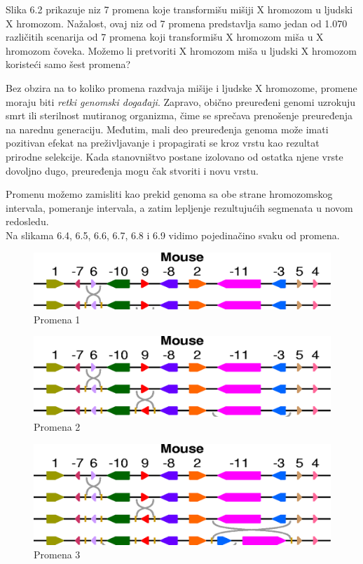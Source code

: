 Slika 6.2 prikazuje niz 7 promena koje transformišu mišiji X hromozom u ljudski X hromozom. Nažalost, ovaj niz od 7 promena predstavlja samo jedan od 1.070 različitih scenarija od 7 promena koji transformišu X hromozom miša u X hromozom čoveka. Možemo li pretvoriti X hromozom miša u ljudski X hromozom koristeći samo šest promena?

Bez obzira na to koliko promena razdvaja mišije i ljudske X hromozome, promene moraju biti \textit{retki genomski događaji}. Zapravo, obično preuređeni genomi uzrokuju smrt ili sterilnost mutiranog organizma, čime se sprečava prenošenje preuređenja na narednu generaciju. Međutim, mali deo preuređenja genoma može imati pozitivan efekat na preživljavanje i propagirati se kroz vrstu kao rezultat prirodne selekcije. Kada stanovništvo postane izolovano od ostatka njene vrste dovoljno dugo, preuređenja mogu čak stvoriti i novu vrstu.

Promenu možemo zamisliti kao prekid genoma sa obe strane hromozomskog intervala, pomeranje intervala, a zatim lepljenje rezultujućih segmenata u novom redosledu.\\


\iffalse 
Na slikama 6.4, 6.5, 6.6, 6.7, 6.8 i 6.9 vidimo pojedinačino svaku od promena.

\begin{figure}[h!]
\centering
\includegraphics[scale=0.32]{poglavlja/6/slike/niz1.png}
\caption{Promena 1}
\label{slika:X}
\end{figure}

\begin{figure}[h!]
\centering
\includegraphics[scale=0.32]{poglavlja/6/slike/niz2.png}
\caption{Promena 2}
\label{slika:X}
\end{figure}

\begin{figure}[h!]
\centering
\includegraphics[scale=0.32]{poglavlja/6/slike/niz3.png}
\caption{Promena 3}
\label{slika:X}
\end{figure}

